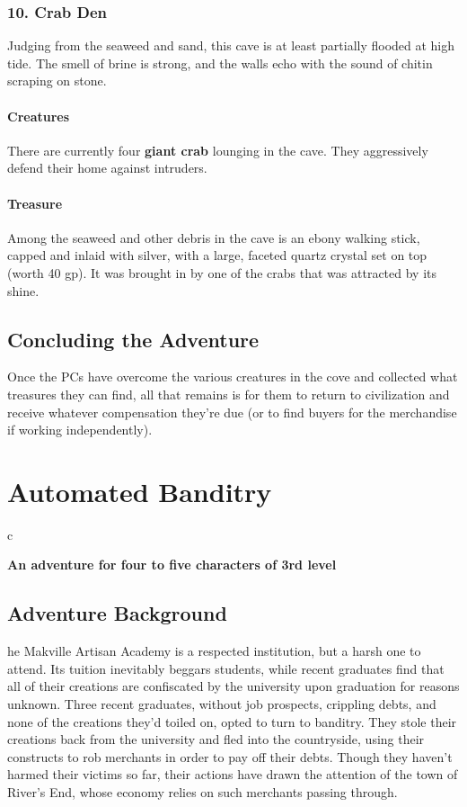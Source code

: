 \documentclass[10pt,a4paper,twoside,bg=print,twocolumn,openany,nodeprecatedcode]{dndbook}
\begin{document}
\subsection{10. Crab Den}
\begin{DndReadAloud}{}
Judging from the seaweed and sand, this cave is at least partially flooded at high tide. The smell of brine is strong, and the walls echo with the sound of chitin scraping on stone.

\end{DndReadAloud}

\subsubsection{Creatures}
There are currently four \textbf{giant crab} lounging in the cave. They aggressively defend their home against intruders.

\subsubsection{Treasure}
Among the seaweed and other debris in the cave is an ebony walking stick, capped and inlaid with silver, with a large, faceted quartz crystal set on top (worth 40 gp). It was brought in by one of the crabs that was attracted by its shine.

\section{Concluding the Adventure}
Once the PCs have overcome the various creatures in the cove and collected what treasures they can find, all that remains is for them to return to civilization and receive whatever compensation they're due (or to find buyers for the merchandise if working independently).

\chapter{Automated Banditry}

\begin{DndTable}{c}

\textbf{An adventure for four to five characters of 3rd level}\\
\end{DndTable}

\section{Adventure Background}
he Makville Artisan Academy is a respected institution, but a harsh one to attend. Its tuition inevitably beggars students, while recent graduates find that all of their creations are confiscated by the university upon graduation for reasons unknown. Three recent graduates, without job prospects, crippling debts, and none of the creations they'd toiled on, opted to turn to banditry. They stole their creations back from the university and fled into the countryside, using their constructs to rob merchants in order to pay off their debts. Though they haven't harmed their victims so far, their actions have drawn the attention of the town of River's End, whose economy relies on such merchants passing through.
\end{document}
